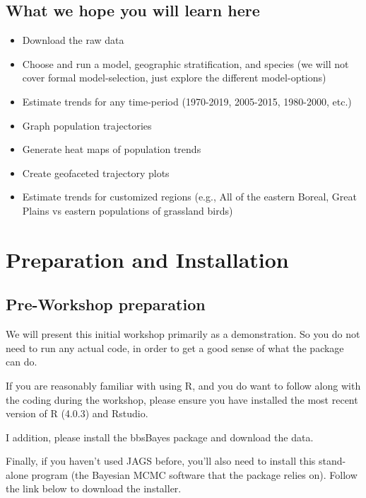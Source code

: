 \documentclass[
]{book}
\begin{document}
\hypertarget{what-we-hope-you-will-learn-here}{%
\section{What we hope you will learn here}\label{what-we-hope-you-will-learn-here}}

\begin{itemize}
\item
  Download the raw data
\item
  Choose and run a model, geographic stratification, and species (we
  will not cover formal model-selection, just explore the different
  model-options)
\item
  Estimate trends for any time-period (1970-2019, 2005-2015,
  1980-2000, etc.)
\item
  Graph population trajectories
\item
  Generate heat maps of population trends
\item
  Create geofaceted trajectory plots
\item
  Estimate trends for customized regions (e.g., All of the eastern
  Boreal, Great Plains vs eastern populations of grassland birds)
\end{itemize}

\hypertarget{Intro}{%
\chapter{Preparation and Installation}\label{Intro}}

\hypertarget{pre-workshop-preparation}{%
\section{Pre-Workshop preparation}\label{pre-workshop-preparation}}

We will present this initial workshop primarily as a demonstration. So you do not need to run any actual code, in order to get a good sense of what the package can do.

If you are reasonably familiar with using R, and you do want to follow along with the coding during the workshop, please ensure you have installed the most recent version of R (4.0.3) and Rstudio.

I addition, please install the bbsBayes package and download the data.

Finally, if you haven't used JAGS before, you'll also need to install this stand-alone program (the Bayesian MCMC software that the package relies on). Follow the link below to download the installer.
\end{document}
